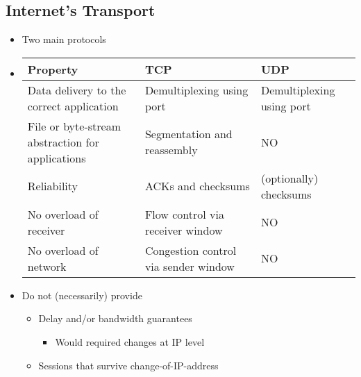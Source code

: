 \subsection{Internet's Transport}
\begin{itemize}
    \item Two main protocols
    \item
        \begin{tabular}{p{} | p{} | l}
            Property & TCP & UDP\\
            \hline
            Data delivery to the correct application & Demultiplexing using port & Demultiplexing using port\\
            \hline
            File or byte-stream abstraction for applications & Segmentation and reassembly & NO\\
            \hline
            Reliability & ACKs and checksums & (optionally) checksums\\
            \hline
            No overload of receiver & Flow control via receiver window & NO\\
            \hline
            No overload of network & Congestion control via sender window & NO
        \end{tabular}
    \item Do not (necessarily) provide
        \begin{itemize}
            \item Delay and/or bandwidth guarantees
                \begin{itemize}
                    \item Would required changes at IP level
                \end{itemize}
            \item Sessions that survive change-of-IP-address
        \end{itemize}
\end{itemize}

